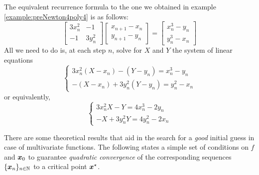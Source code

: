 \begin{example}
The equivalent recurrence formula to the one we obtained in example \ref{example:preNewton4poly4} is as follows:
\begin{equation*}
\begin{bmatrix} 3x_n^2 & -1 \\ -1 & 3y_n^2 \end{bmatrix} \begin{bmatrix} x_{n+1}-x_n \\ y_{n+1}-y_n \end{bmatrix} = \begin{bmatrix} x_n^3 - y_n \\ y_n^3 - x_n \end{bmatrix}
\end{equation*}
All we need to do is, at each step $n$, solve for $X$ and $Y$ the system of linear equations
\begin{equation*}
\begin{cases}
3x_n^2 (X-x_n) - (Y-y_n)  = x_n^3 - y_n \\
-(X-x_n) + 3y_n^2 (Y-y_n) = y_n^2 - x_n
\end{cases}
\end{equation*}
or equivalently,
\begin{equation*}
\begin{cases}
3x_n^2 X - Y = 4x_n^3 - 2y_n \\
-X + 3y_n^2 Y = 4y_n^2 - 2x_n
\end{cases}
\end{equation*}
\end{example}

\separator

There are some theoretical results that aid in the search for a \emph{good} initial guess in case of multivariate functions.  The following states a simple set of conditions on $f$ and $\boldsymbol{x}_0$ to guarantee \emph{quadratic convergence} of the corresponding sequences $\{ \boldsymbol{x}_n \}_{n \in \mathbb{N}}$ to a critical point $\boldsymbol{x}^{\star}$.

